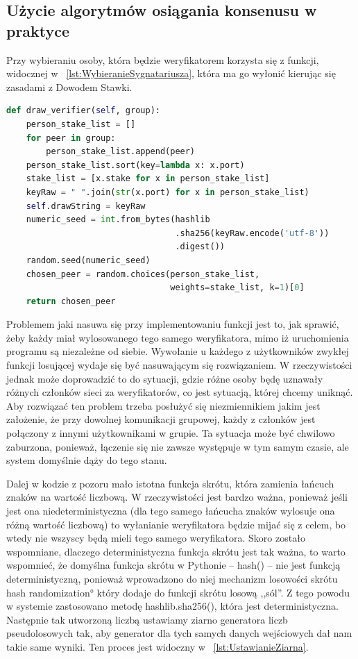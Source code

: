 \subsection{Użycie algorytmów osiągania konsenusu w praktyce}
\label{ssec:KonsensusUzycie}
Przy wybieraniu osoby, która będzie weryfikatorem korzysta się z funkcji, widocznej w \lstlistingname{~\ref{lst:WybieranieSygnatariusza}}, która ma go wyłonić kierując się zasadami z Dowodem Stawki.

\begin{lstlisting}[language=Python, extendedchars=true, caption={Funkcja wybierająca sygnatariusza}, label={lst:WybieranieSygnatariusza}]
def draw_verifier(self, group):
    person_stake_list = []
    for peer in group:
        person_stake_list.append(peer)
    person_stake_list.sort(key=lambda x: x.port)
    stake_list = [x.stake for x in person_stake_list]
    keyRaw = " ".join(str(x.port) for x in person_stake_list)
    self.drawString = keyRaw
    numeric_seed = int.from_bytes(hashlib
                                  .sha256(keyRaw.encode('utf-8'))
                                  .digest())
    random.seed(numeric_seed)
    chosen_peer = random.choices(person_stake_list,
                                 weights=stake_list, k=1)[0]
    return chosen_peer
\end{lstlisting} 
 Problemem jaki nasuwa się przy implementowaniu funkcji jest to, jak sprawić, żeby każdy miał wylosowanego tego samego weryfikatora, mimo iż uruchomienia programu są niezależne od siebie. Wywołanie u każdego z użytkowników zwykłej funkcji losującej wydaje się być nasuwającym się rozwiązaniem. W rzeczywistości jednak może doprowadzić to do sytuacji, gdzie różne osoby będę uznawały różnych członków sieci za weryfikatorów, co jest sytuacją, której chcemy uniknąć. Aby rozwiązać ten problem trzeba posłużyć się niezmiennikiem jakim jest założenie, że przy dowolnej komunikacji grupowej, każdy z członków jest połączony z innymi użytkownikami w grupie. Ta sytuacja może być chwilowo zaburzona, ponieważ, łączenie się nie zawsze występuje w tym samym czasie, ale system domyślnie dąży do tego stanu.

Dalej w kodzie z pozoru mało istotna funkcja skrótu, która zamienia łańcuch znaków na wartość liczbową. W rzeczywistości jest bardzo ważna, ponieważ jeśli jest ona niedeterministyczna (dla tego samego łańcucha znaków wylosuje ona różną wartość liczbową) to wyłanianie weryfikatora będzie mijać się z celem, bo wtedy nie wszyscy będą mieli tego samego weryfikatora. Skoro zostało wspomniane, dlaczego deterministyczna funkcja skrótu jest tak ważna, to warto wspomnieć, że domyślna funkcja skrótu w Pythonie – hash() – nie jest funkcją deterministyczną, ponieważ wprowadzono do niej mechanizm losowości skrótu \ang{hash randomization} który dodaje do funkcji skrótu losową ,,sól”. Z tego powodu w systemie zastosowano metodę hashlib.sha256(), która jest deterministyczna. Następnie tak utworzoną liczbą ustawiamy ziarno generatora liczb pseudolosowych tak, aby generator dla tych samych danych wejściowych dał nam takie same wyniki. Ten proces jest widoczny w \lstlistingname{~\ref{lst:UstawianieZiarna}}.

